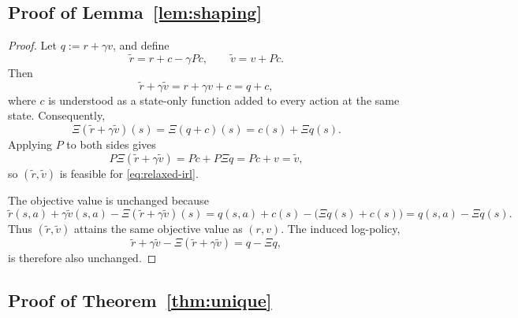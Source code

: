 \subsection{Proof of Lemma~\ref{lem:shaping}}

\begin{proof}
Let \(q:=r+\gamma v\), and define
\[
\tilde r=r+c-\gamma Pc,
\qquad
\tilde v=v+Pc.
\]
Then
\[
\tilde r+\gamma \tilde v
=
r+\gamma v + c
=
q+c,
\]
where \(c\) is understood as a state-only function added to every action at
the same state. Consequently,
\[
\Xi(\tilde r+\gamma\tilde v)(s)
=
\Xi(q+c)(s)
=
c(s)+\Xi q(s).
\]
Applying \(P\) to both sides gives
\[
P\Xi(\tilde r+\gamma\tilde v)
=
Pc + P\Xi q
=
Pc + v
=
\tilde v,
\]
so \((\tilde r,\tilde v)\) is feasible for \eqref{eq:relaxed-irl}.

The objective value is unchanged because
\[
\tilde r(s,a)+\gamma \tilde v(s,a)-\Xi(\tilde r+\gamma\tilde v)(s)
=
q(s,a)+c(s)-\bigl(\Xi q(s)+c(s)\bigr)
=
q(s,a)-\Xi q(s).
\]
Thus \((\tilde r,\tilde v)\) attains the same objective value as \((r,v)\).
The induced log-policy,
\[
\tilde r+\gamma \tilde v-\Xi(\tilde r+\gamma\tilde v)
=
q-\Xi q,
\]
is therefore also unchanged.
\end{proof}

\subsection{Proof of Theorem~\ref{thm:unique}}

